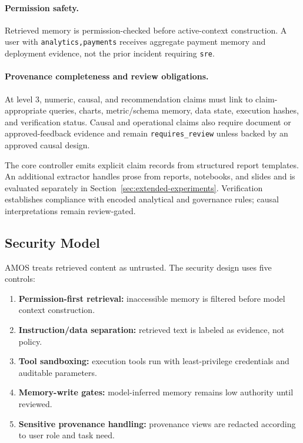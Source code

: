 \documentclass[sigconf,nonacm]{acmart}
\newcommand{\amos}{\textsc{AMOS}\xspace}
\newcommand{\code}[1]{\texttt{#1}}
\begin{document}
\paragraph{Permission safety.} Retrieved memory is permission-checked before active-context construction. A user with \code{analytics,payments} receives aggregate payment memory and deployment evidence, not the prior incident requiring \code{sre}.

\paragraph{Provenance completeness and review obligations.} At level 3, numeric, causal, and recommendation claims must link to claim-appropriate queries, charts, metric/schema memory, data state, execution hashes, and verification status. Causal and operational claims also require document or approved-feedback evidence and remain \code{requires\_review} unless backed by an approved causal design.

The core controller emits explicit claim records from structured report templates. An additional extractor handles prose from reports, notebooks, and slides and is evaluated separately in Section~\ref{sec:extended-experiments}. Verification establishes compliance with encoded analytical and governance rules; causal interpretations remain review-gated.

\subsection{Security Model}
\amos treats retrieved content as untrusted. The security design uses five controls:
\begin{enumerate}
    \item \textbf{Permission-first retrieval:} inaccessible memory is filtered before model context construction.
    \item \textbf{Instruction/data separation:} retrieved text is labeled as evidence, not policy.
    \item \textbf{Tool sandboxing:} execution tools run with least-privilege credentials and auditable parameters.
    \item \textbf{Memory-write gates:} model-inferred memory remains low authority until reviewed.
    \item \textbf{Sensitive provenance handling:} provenance views are redacted according to user role and task need.
\end{enumerate}
\end{document}

